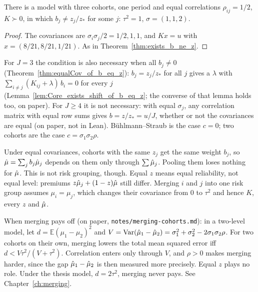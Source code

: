\begin{theorem}\label{thm:exists_b_ne_z_equalCorr}
  \leanok
  There is a model with three cohorts, one period and equal correlations
  $\rho_{ij} = 1/2$, $K \succ 0$, in which $b_j \ne z_j/z_*$ for some $j$:
  $\tau^2 = 1$, $\sigma = (1, 1, 2)$.
\end{theorem}
\begin{proof}
  \leanok
  The covariances are $\sigma_i\sigma_j/2 = 1/2, 1, 1$, and $Kx = u$ with
  $x = (8/21, 8/21, 1/21)$. As in Theorem~\ref{thm:exists_b_ne_z}.
\end{proof}

\begin{remark}\label{rem:equalCov}
  For $J = 3$ the condition is also necessary when all $b_j \ne 0$
  (Theorem~\ref{thm:equalCov_of_b_eq_z}): $b_j = z_j/z_*$ for all $j$ gives a
  $\lambda$ with $\sum_{i \ne j} (K_{ij} + \lambda)\, b_i = 0$ for every $j$
  (Lemma~\ref{lem:Core_exists_shift_of_b_eq_z}; the converse of that lemma holds
  too, on paper). For $J \ge 4$ it is not necessary: with equal $\sigma_j$, any
  correlation matrix with equal row sums gives $b = z/z_* = u/J$, whether or not
  the covariances are equal (on paper, not in Lean). Bühlmann--Straub is the case
  $c = 0$; two cohorts are the case $c = \sigma_1\sigma_2\rho$.
\end{remark}

\begin{remark}\label{rem:equalZ_grouping}
  Under equal covariances, cohorts with the same $z_j$ get the same weight
  $b_j$, so $\hat\mu = \sum_j b_j \hat\mu_j$ depends on them only through
  $\sum \hat\mu_j$. Pooling them loses nothing for $\hat\mu$. This is not risk
  grouping, though. Equal $z$ means equal reliability, not equal level:
  premiums $z\hat\mu_j + (1-z)\hat\mu$ still differ. Merging $i$ and $j$ into one
  risk group assumes $\mu_i = \mu_j$, which changes their covariance from
  $0$ to $\tau^2$ and hence $K$, every $z$ and $\hat\mu$.

  When merging pays off (on paper, \texttt{notes/merging-cohorts.md}): in a
  two-level model, let $d = \mathbb{E}(\mu_1-\mu_2)^2$ and
  $V = \operatorname{Var}(\hat\mu_1 - \hat\mu_2) = \sigma_1^2+\sigma_2^2-2\sigma_1\sigma_2\rho$.
  For two cohorts on their own, merging lowers the total mean squared error
  iff $d < V\tau^2/(V+\tau^2)$. Correlation enters only through $V$, and
  $\rho > 0$ makes merging harder, since the gap $\hat\mu_1 - \hat\mu_2$ is then
  measured more precisely. Equal $z$ plays no role. Under the thesis model,
  $d = 2\tau^2$, merging never pays. See Chapter~\ref{ch:merging}.
\end{remark}

